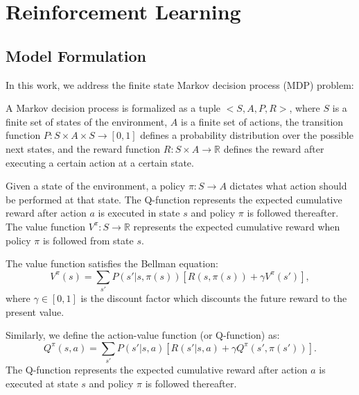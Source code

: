 
\chapter{Reinforcement Learning}
\label{ch:RL}
\section{Model Formulation}

In this work, we address the finite state Markov decision process (MDP) problem:
\begin{definition} A Markov decision process is formalized as a tuple $<S, A, P, R>$, where $S$ is a finite set of states of the environment, $A$ is
 a finite set of actions, the transition function $P:S \times A \times S \rightarrow [0, 1]$ defines a
 probability distribution over the possible next states, and the reward function $R:S \times A \rightarrow \mathbb{R}$ defines
 the reward after executing a certain action at a certain state.
\end{definition}

Given a state of the environment, a policy $\pi: S \rightarrow A$ dictates what action should be performed at that state. 
The Q-function represents the expected cumulative reward after action $a$ is executed in state $s$ and 
policy $\pi$ is followed thereafter.
The value function $V^{\pi}: S \rightarrow \mathbb{R}$ represents the expected cumulative reward when 
policy $\pi$ is followed from state $s$.

The value function satisfies the Bellman equation:
\begin{equation}
    V^{\pi}(s) = \sum_{s'}P(s'|s, \pi(s))[R(s, \pi(s)) + \gamma V^{\pi}(s')],
    \label{eq:V}
\end{equation}
where $\gamma \in [0, 1]$ is the discount factor which discounts the future reward to the present value.

Similarly, we define the action-value function (or Q-function) as:
\begin{equation}
    Q^{\pi}(s, a) = \sum_{s'}P(s'|s, a)[R(s'|s, a) + \gamma Q^{\pi}(s', \pi(s'))].
    \label{eq:Q}
\end{equation}
The Q-function represents the expected cumulative reward after action $a$ is executed at state $s$ and 
policy $\pi$ is followed thereafter.

